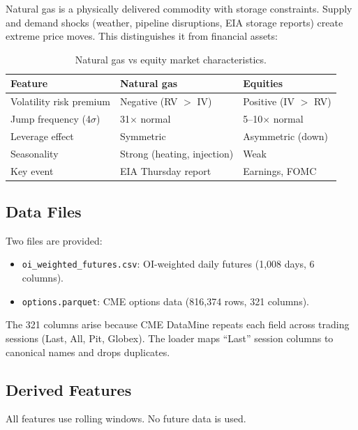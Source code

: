 \documentclass[11pt,a4paper]{article}
\begin{document}
Natural gas is a physically delivered commodity with storage constraints. Supply and demand shocks (weather, pipeline disruptions, EIA storage reports) create extreme price moves. This distinguishes it from financial assets:

\begin{table}[H]
\centering
\caption{Natural gas vs equity market characteristics.}
\begin{tabular}{lll}
\toprule
Feature & Natural gas & Equities \\
\midrule
Volatility risk premium & Negative (RV $>$ IV) & Positive (IV $>$ RV) \\
Jump frequency (4$\sigma$) & 31$\times$ normal & 5--10$\times$ normal \\
Leverage effect & Symmetric & Asymmetric (down) \\
Seasonality & Strong (heating, injection) & Weak \\
Key event & EIA Thursday report & Earnings, FOMC \\
\bottomrule
\end{tabular}
\end{table}

\subsection{Data Files}

Two files are provided:
\begin{itemize}[nosep]
\item \texttt{oi\_weighted\_futures.csv}: OI-weighted daily futures (1,008 days, 6 columns).
\item \texttt{options.parquet}: CME options data (816,374 rows, 321 columns).
\end{itemize}

The 321 columns arise because CME DataMine repeats each field across trading sessions (Last, All, Pit, Globex). The loader maps ``Last'' session columns to canonical names and drops duplicates.

\subsection{Derived Features}

All features use rolling windows. No future data is used.
\end{document}
